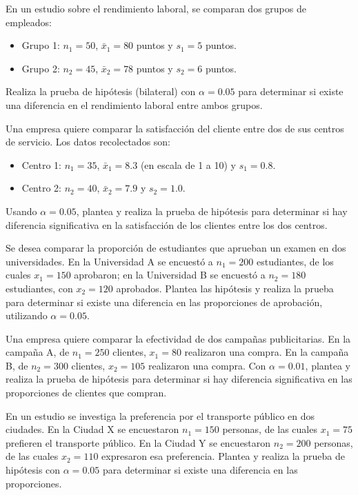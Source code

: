 \documentclass[addpoints,12pt]{exam}
\theoremstyle{plain}
\theoremstyle{remark}
\theoremstyle{definition}
\begin{document}
\begin{questions}
 \question  En un estudio sobre el rendimiento laboral, se comparan dos grupos de empleados:
    \begin{itemize}
        \item Grupo 1: \( n_1 = 50 \), \( \bar{x}_1 = 80 \) puntos y \( s_1 = 5 \) puntos.
        \item Grupo 2: \( n_2 = 45 \), \( \bar{x}_2 = 78 \) puntos y \( s_2 = 6 \) puntos.
    \end{itemize}
    Realiza la prueba de hipótesis (bilateral) con \(\alpha = 0.05\) para determinar si existe una diferencia en el rendimiento laboral entre ambos grupos.
    
 \question   Una empresa quiere comparar la satisfacción del cliente entre dos de sus centros de servicio. Los datos recolectados son:
    \begin{itemize}
        \item Centro 1: \( n_1 = 35 \), \( \bar{x}_1 = 8.3 \) (en escala de 1 a 10) y \( s_1 = 0.8 \).
        \item Centro 2: \( n_2 = 40 \), \( \bar{x}_2 = 7.9 \) y \( s_2 = 1.0 \).
    \end{itemize}
    Usando \(\alpha = 0.05\), plantea y realiza la prueba de hipótesis para determinar si hay diferencia significativa en la satisfacción de los clientes entre los dos centros.

 \question  Se desea comparar la proporción de estudiantes que aprueban un examen en dos universidades. En la Universidad A se encuestó a \( n_1 = 200 \) estudiantes, de los cuales \( x_1 = 150 \) aprobaron; en la Universidad B se encuestó a \( n_2 = 180 \) estudiantes, con \( x_2 = 120 \) aprobados. Plantea las hipótesis y realiza la prueba para determinar si existe una diferencia en las proporciones de aprobación, utilizando \(\alpha = 0.05\).
    
   \question  Una empresa quiere comparar la efectividad de dos campañas publicitarias. En la campaña A, de \( n_1 = 250 \) clientes, \( x_1 = 80 \) realizaron una compra. En la campaña B, de \( n_2 = 300 \) clientes, \( x_2 = 105 \) realizaron una compra. Con \(\alpha = 0.01\), plantea y realiza la prueba de hipótesis para determinar si hay diferencia significativa en las proporciones de clientes que compran.
    
     \question
    En un estudio se investiga la preferencia por el transporte público en dos ciudades. En la Ciudad X se encuestaron \( n_1 = 150 \) personas, de las cuales \( x_1 = 75 \) prefieren el transporte público. En la Ciudad Y se encuestaron \( n_2 = 200 \) personas, de las cuales \( x_2 = 110 \) expresaron esa preferencia. Plantea y realiza la prueba de hipótesis con \(\alpha = 0.05\) para determinar si existe una diferencia en las proporciones.
    

\end{questions}
\end{document}
